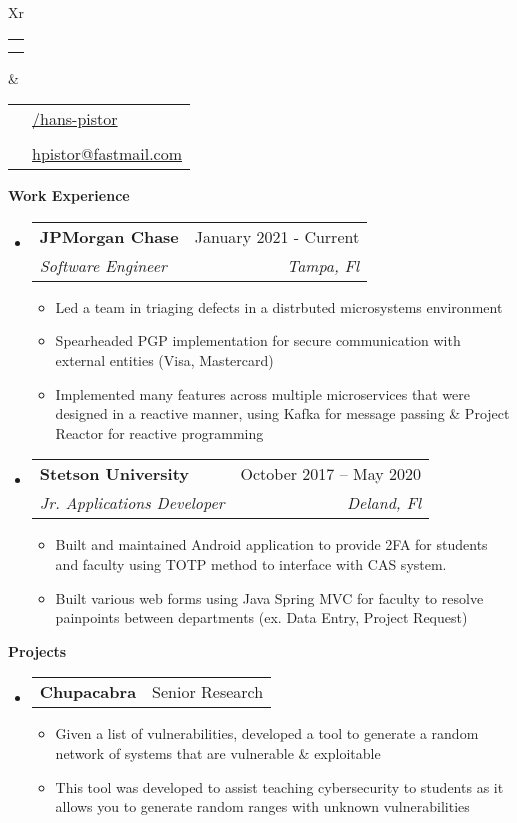 \documentclass[letterpaper,12pt]{article}[leftmargin=*]
\makeatletter
\def \fullname {Hans Pistor}
\def \subtitle {}
\def \phoneicon {\faPhone}
\def \phonetext {+1-407-443-5855}
\def \emailicon {\faEnvelope}
\def \emaillink {mailto:hpistor@fastmail.com}
\def \emailtext {hpistor@fastmail.com}
\def \githubicon {\faGithub}
\def \githublink {https://github.com/hans-pistor}
\def \githubtext {/hans-pistor}
\def \headertype {\doublecol} %
\def \entryspacing {-0pt}
\def \phone {\phoneicon \hspace{3pt}{ \phonetext}}
\def \email {\emailicon \hspace{3pt}\href{\emaillink}{\emailtext}}
\def \github {\githubicon \hspace{3pt}\href{\githublink}{\githubtext}}
\renewcommand{\section}[2]{\vspace{5pt}
  \colorbox{secondary}{\color{white}\raggedbottom\normalsize\textbf{{#1}{\hspace{7pt}#2}}}
}
\newcommand{\resumeEntryStart}{\begin{itemize}[leftmargin=2.5mm]}
\newcommand{\resumeEntryEnd}{\end{itemize}\vspace{\entryspacing}}
\newcommand{\resumeItemListStart}{\begin{itemize}[leftmargin=4.5mm]}
\newcommand{\resumeItemListEnd}{\end{itemize}}
\newcommand{\resumeItem}[1]{
  \item\small{
    {#1 \vspace{-2pt}}
  }
}
\newcommand{\resumeEntryTSDL}[4]{
  \vspace{-1pt}\item[]
    \begin{tabularx}{0.97\textwidth}{X@{\hspace{60pt}}r}
      \textbf{\color{primary}#1} & {\firabook\color{accent}\small#2} \\
      \textit{\color{accent}\small#3} & \textit{\color{accent}\small#4} \\
    \end{tabularx}\vspace{-6pt}
}
\newcommand{\resumeEntryTD}[2]{
  \vspace{-1pt}\item[]
    \begin{tabularx}{0.97\textwidth}{X@{\hspace{60pt}}r}
      \textbf{\color{primary}#1} & {\firabook\color{accent}\small#2} \\
    \end{tabularx}\vspace{-6pt}
}
\newcommand{\doublecol}[6]{
  \begin{tabularx}{\textwidth}{Xr}
    {
      \begin{tabular}[c]{l}
        \fontsize{35}{45}\selectfont{\color{primary}{{\textbf{\fullname}}}} \\
        {\textit{\subtitle}} %
      \end{tabular}
    } & {
      \begin{tabular}[c]{l@{\hspace{1.5em}}l}
        {\small#4} & {\small#1} \\
        {\small#5} & {\small#2} \\
        {\small#6} & {\small#3}
      \end{tabular}
    }
  \end{tabularx}
}
\newcommand{\singlecol}[6]{
  \begin{tabularx}{\textwidth}{Xr}
    {
      \begin{tabular}[b]{l}
        \fontsize{35}{45}\selectfont{\color{primary}{{\textbf{\fullname}}}} \\
        {\textit{\subtitle}} %
      \end{tabular}
    } & {
      \begin{tabular}[c]{l}
        {\small#1} \\
        {\small#2} \\
        {\small#3} \\
        {\small#4} \\
        {\small#5} \\
        {\small#6}
      \end{tabular}
    }
  \end{tabularx}
}
\makeatother
\begin{document}


\headertype{\github}{\phone}{\email}{}{}{} %
\vspace{-10pt} %


\section{\faPieChart}{Work Experience}

  \resumeEntryStart
    \resumeEntryTSDL
      {JPMorgan Chase}{January 2021 - Current}
      {Software Engineer}{Tampa, Fl}
    \resumeItemListStart
      \resumeItem {Led a team in triaging defects in a distrbuted microsystems environment}
      \resumeItem {Spearheaded PGP implementation for secure communication with external entities (Visa, Mastercard)}
      \resumeItem{Implemented many features across multiple microservices that were designed in a reactive manner, using Kafka for message passing \& Project Reactor for reactive programming}
    \resumeItemListEnd
  \resumeEntryEnd

  \resumeEntryStart
    \resumeEntryTSDL
      {Stetson University}{October 2017 -- May 2020}
      {Jr. Applications Developer }{Deland, Fl}
    \resumeItemListStart
      \resumeItem {Built and maintained Android application to provide 2FA for students and faculty using TOTP method to interface with CAS system.}
      \resumeItem {Built various web forms using Java Spring MVC for faculty to resolve painpoints between departments (ex. Data Entry, Project Request)}
    \resumeItemListEnd
  \resumeEntryEnd



\section{\faFlask}{Projects}

  \resumeEntryStart
    \resumeEntryTD
      {Chupacabra}{Senior Research}
    \resumeItemListStart
      \resumeItem{Given a list of vulnerabilities, developed a tool to generate a random network of systems that are vulnerable \& exploitable}
      \resumeItem{This tool was developed to assist teaching cybersecurity to students as it allows you to generate random ranges with unknown vulnerabilities}
    \resumeItemListEnd
  \resumeEntryEnd
\end{document}
